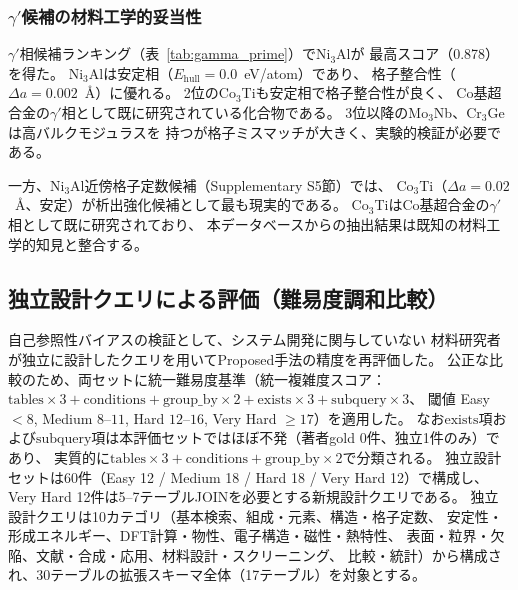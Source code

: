 \documentclass[5p,twocolumn]{elsarticle}
\begin{document}
\subsubsection{$\gamma'$候補の材料工学的妥当性}

$\gamma'$相候補ランキング（表~\ref{tab:gamma_prime}）でNi$_3$Alが
最高スコア（0.878）を得た。
Ni$_3$Alは安定相（$E_\text{hull} = 0.0$~eV/atom）であり、
格子整合性（$\Delta a = 0.002$~\AA）に優れる。
2位のCo$_3$Tiも安定相で格子整合性が良く、
Co基超合金の$\gamma'$相として既に研究されている化合物である。
3位以降のMo$_3$Nb、Cr$_3$Geは高バルクモジュラスを
持つが格子ミスマッチが大きく、実験的検証が必要である。

一方、Ni$_3$Al近傍格子定数候補（Supplementary S5節）では、
Co$_3$Ti（$\Delta a = 0.02$~\AA、安定）が析出強化候補として最も現実的である。
Co$_3$TiはCo基超合金の$\gamma'$相として既に研究されており、
本データベースからの抽出結果は既知の材料工学的知見と整合する。

\subsection{独立設計クエリによる評価（難易度調和比較）}
\label{sec:independent_eval}

自己参照性バイアスの検証として、システム開発に関与していない
材料研究者が独立に設計したクエリを用いてProposed手法の精度を再評価した。
公正な比較のため、両セットに統一難易度基準（統一複雑度スコア：
$\text{tables} \times 3 + \text{conditions} + \text{group\_by} \times 2 + \text{exists} \times 3 + \text{subquery} \times 3$、
閾値 Easy $< 8$, Medium $8$--$11$, Hard $12$--$16$, Very Hard $\geq 17$）を適用した。
なお$\text{exists}$項および$\text{subquery}$項は本評価セットではほぼ不発（著者gold 0件、独立1件のみ）であり、
実質的に$\text{tables} \times 3 + \text{conditions} + \text{group\_by} \times 2$で分類される。
独立設計セットは60件（Easy 12 / Medium 18 / Hard 18 / Very Hard 12）で構成し、
Very Hard 12件は5--7テーブルJOINを必要とする新規設計クエリである。
独立設計クエリは10カテゴリ（基本検索、組成・元素、構造・格子定数、
安定性・形成エネルギー、DFT計算・物性、電子構造・磁性・熱特性、
表面・粒界・欠陥、文献・合成・応用、材料設計・スクリーニング、
比較・統計）から構成され、30テーブルの拡張スキーマ全体（17テーブル）を対象とする。
\end{document}
